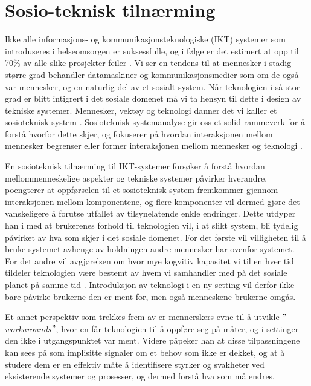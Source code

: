 \section{Sosio-teknisk tilnærming}
\label{section:sosioteknisk}

Ikke alle informasjons- og kommunikasjonsteknologiske (IKT) systemer som introduseres i helseomsorgen er suksessfulle, og i følge \citet{FITT} er det estimert at opp til 70\% av alle slike prosjekter feiler \citep{Coiera07}.
Vi ser en tendens til at mennesker i stadig større grad behandler datamaskiner og kommunikasjonsmedier som om de også var mennesker, og en naturlig del av et sosialt system. Når teknologien i så stor grad er blitt intigrert i det sosiale domenet må vi ta hensyn til dette i design av tekniske systemer. Mennesker, vektøy og teknologi danner det vi kaller et sosioteknisk system \citep{Coiera04}.
Sosioteknisk systemanalyse gir oss et solid rammeverk for å forstå hvorfor dette skjer, og fokuserer på hvordan interaksjonen mellom mennesker begrenser eller former interaksjonen mellom mennesker og teknologi \citep{Coiera07}. 

\noindent
En sosioteknisk tilnærming til IKT-systemer forsøker å forstå hvordan mellommenneskelige aspekter og  tekniske systemer påvirker hverandre. \citet{Coiera04} poengterer at oppførselen til et sosioteknisk system fremkommer gjennom interaksjonen mellom komponentene, og flere komponenter vil dermed gjøre det vanskeligere å forutse utfallet av tilsynelatende enkle endringer. Dette utdyper han i \citep{Coiera07} med at brukerenes forhold til teknologien vil, i at slikt system, bli tydelig påvirket av hva som skjer i det sosiale domenet. For det første vil villigheten til å bruke systemet avhenge av holdningen andre mennesker har ovenfor systemet. For det andre vil avgjørelsen om hvor mye kogvitiv kapasitet vi til en hver tid tildeler teknologien være bestemt av hvem vi samhandler med på det sosiale planet på samme tid \citep{Coiera07}. Introduksjon av teknologi i en ny setting vil derfor ikke bare påvirke brukerne den er ment for, men også menneskene brukerne omgås.

\noindent
Et annet perspektiv som trekkes frem av \citet{Coiera07} er mennerskers evne til å utvikle \emph{$"$workarounds$"$}, hvor en får teknologien til å oppføre seg på måter, og i settinger den ikke i utgangspunktet var ment. Videre påpeker han at disse tilpassningene kan sees på som  implisitte signaler om et behov som ikke er dekket, og at å studere dem er en effektiv måte å identifisere styrker og svakheter ved eksisterende systemer og prosesser, og dermed forstå hva som må endres. 

